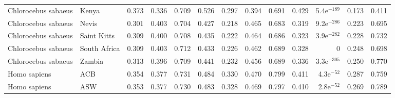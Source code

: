 \begin{longtable}{llrrrrrrrrrrr}
 Chlorocebus sabaeus &                     Kenya &                              0.373 &                               0.336 &                 0.709 &                 0.526 &                              0.297 &                               0.394 &                 0.691 &                 0.429 & 5.4e$^{-189}$ &  0.173 &  0.411 \\
 Chlorocebus sabaeus &                     Nevis &                              0.301 &                               0.403 &                 0.704 &                 0.427 &                              0.218 &                               0.465 &                 0.683 &                 0.319 & 9.2e$^{-286}$ &  0.223 &  0.695 \\
 Chlorocebus sabaeus &               Saint Kitts &                              0.309 &                               0.400 &                 0.708 &                 0.435 &                              0.222 &                               0.464 &                 0.686 &                 0.323 & 3.9e$^{-282}$ &  0.228 &  0.732 \\
 Chlorocebus sabaeus &              South Africa &                              0.309 &                               0.403 &                 0.712 &                 0.433 &                              0.226 &                               0.462 &                 0.689 &                 0.328 &             0 &  0.248 &  0.698 \\
 Chlorocebus sabaeus &                    Zambia &                              0.313 &                               0.396 &                 0.709 &                 0.441 &                              0.232 &                               0.456 &                 0.689 &                 0.336 & 3.3e$^{-305}$ &  0.250 &  0.770 \\
        Homo sapiens &                       ACB &                              0.354 &                               0.377 &                 0.731 &                 0.484 &                              0.330 &                               0.470 &                 0.799 &                 0.411 &  4.3e$^{-52}$ &  0.287 &  0.759 \\
        Homo sapiens &                       ASW &                              0.353 &                               0.377 &                 0.730 &                 0.483 &                              0.328 &                               0.469 &                 0.797 &                 0.410 &  2.8e$^{-52}$ &  0.269 &  0.789 \\

\end{longtable}
